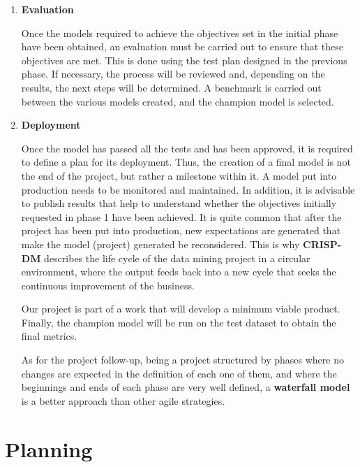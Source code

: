 \begin{enumerate}
    
    \item \textbf{Evaluation}

    Once the models required to achieve the objectives set in the initial phase have been obtained, an evaluation must be carried out to ensure that these objectives are met. This is done using the test plan designed in the previous phase. If necessary, the process will be reviewed and, depending on the results, the next steps will be determined. A benchmark is carried out between the various models created, and the champion model is selected. 

    
    \item \textbf{Deployment}

    Once the model has passed all the tests and has been approved, it is required to define a plan for its deployment. Thus, the creation of a final model is not the end of the project, but rather a milestone within it. A model put into production needs to be monitored and maintained. In addition, it is advisable to publish results that help to understand whether the objectives initially requested in phase 1 have been achieved. It is quite common that after the project has been put into production, new expectations are generated that make the model (project) generated be reconsidered. This is why \textbf{CRISP-DM} describes the life cycle of the data mining project in a circular environment, where the output feeds back into a new cycle that seeks the continuous improvement of the business.

    Our project is part of a work that will develop a minimum viable product. Finally, the champion model will be run on the test dataset to obtain the final metrics.

As for the project follow-up, being a project structured by phases where no changes are expected in the definition of each one of them, and where the beginnings and ends of each phase are very well defined, a \textbf{waterfall model} is a better approach than other agile strategies.

    
\end{enumerate}


\section{Planning}

